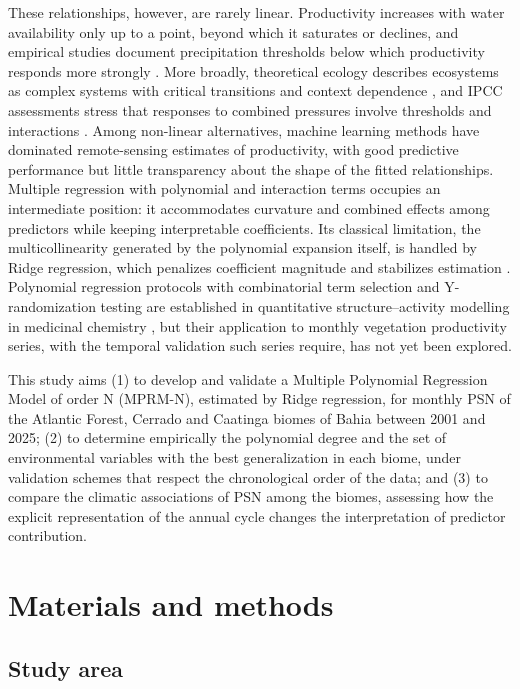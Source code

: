 \documentclass[a4paper,fleqn]{cas-dc}
\begin{document}
These relationships, however, are rarely linear. Productivity increases with water availability only up to a point, beyond which it saturates or declines, and empirical studies document precipitation thresholds below which productivity responds more strongly \citep{jin2018,linger2020,mwangi2025}. More broadly, theoretical ecology describes ecosystems as complex systems with critical transitions and context dependence \citep{levin1998,flores2024}, and IPCC assessments stress that responses to combined pressures involve thresholds and interactions \citep{ipcc2022}. Among non-linear alternatives, machine learning methods have dominated remote-sensing estimates of productivity, with good predictive performance but little transparency about the shape of the fitted relationships. Multiple regression with polynomial and interaction terms occupies an intermediate position: it accommodates curvature and combined effects among predictors while keeping interpretable coefficients. Its classical limitation, the multicollinearity generated by the polynomial expansion itself, is handled by Ridge regression, which penalizes coefficient magnitude and stabilizes estimation \citep{hoerl1970}. Polynomial regression protocols with combinatorial term selection and Y-randomization testing are established in quantitative structure--activity modelling in medicinal chemistry \citep{guimaraes2024}, but their application to monthly vegetation productivity series, with the temporal validation such series require, has not yet been explored.

This study aims (1) to develop and validate a Multiple Polynomial Regression Model of order N (MPRM-N), estimated by Ridge regression, for monthly PSN of the Atlantic Forest, Cerrado and Caatinga biomes of Bahia between 2001 and 2025; (2) to determine empirically the polynomial degree and the set of environmental variables with the best generalization in each biome, under validation schemes that respect the chronological order of the data; and (3) to compare the climatic associations of PSN among the biomes, assessing how the explicit representation of the annual cycle changes the interpretation of predictor contribution.

\section{Materials and methods}\label{sec:methods}

\subsection{Study area}
\end{document}

